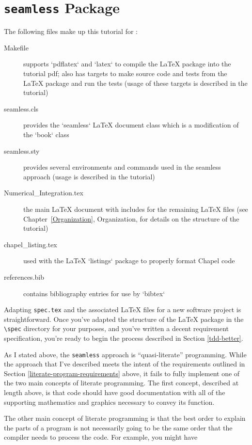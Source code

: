 \section{\texttt{seamless} Package}

The following files make up this tutorial for \seamless:
\begin{description}
  \item[Makefile] supports `pdflatex` and `latex` to compile the LaTeX package into the tutorial
    pdf; also has targets to make source code and tests from the LaTeX package and run the tests (usage of these
    targets is described in the tutorial)
  \item[seamless.cls] provides the `seamless` LaTeX document class which is a modification of the `book` class
  \item[seamless.sty] provides several environments and commands used in the seamless approach (usage is described
    in the tutorial)
  \item[Numerical\_Integration.tex] the main LaTeX document with includes for the remaining LaTeX files 
    (see Chapter~\ref{Organization}, Organization, for details on the structure of the tutorial)
  \item[chapel\_listing.tex] used with the LaTeX `listings` package to properly format Chapel code
  \item[references.bib] contains bibliography entries for use by `bibtex`
\end{description}

Adapting \lstinline{spec.tex} and the associated \LaTeX\xspace files for a new software project is straightforward. 
Once you've adapted the structure of the \LaTeX\xspace package in the \lstinline{\spec} directory for your
purposes, and you've written a decent requirement specification, you're ready to begin the process described in
Section \ref{tdd-better}. 

As I stated above, the \lstinline{seamless} approach is ``quasi-literate'' programming.  While the approach
that I've described meets the intent of the requirements outlined in Section 
\ref{literate-program-requirements} above, it fails to fully implement one of the two main concepts of
literate programming.\cite{knuth}
The first concept, described at length above, is that code should have good documentation with all of the
supporting mathematics and graphics necessary to convey its function.

The other main concept of literate programming is that the best order to explain the parts of a program 
is not necessarily going to be the same order that the compiler needs to process the code. 
For example, you might have

